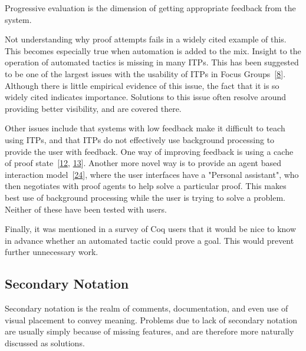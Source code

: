 \documentclass[
]{article}
\begin{document}
Progressive evaluation is the dimension of getting appropriate feedback
from the system.

Not understanding why proof attempts fails in a widely cited example of
this. This becomes especially true when automation is added to the mix.
Insight to the operation of automated tactics is missing in many ITPs.
This has been suggested to be one of the largest issues with the
usability of ITPs in Focus
Groups~{[}\protect\hyperlink{ref-beckert_usability_2015}{8}{]}. Although
there is little empirical evidence of this issue, the fact that it is so
widely cited indicates importance. Solutions to this issue often resolve
around providing better visibility, and are covered there.

Other issues include that systems with low feedback make it difficult to
teach using ITPs, and that ITPs do not effectively use background
processing to provide the user with feedback. One way of improving
feedback is using a cache of proof
state~{[}\protect\hyperlink{ref-berman_development_2014}{12},
\protect\hyperlink{ref-bourke_challenges_2012}{13}{]}. Another more
novel way is to provide an agent based interaction
model~{[}\protect\hyperlink{ref-hunter_agent-based_2005}{24}{]}, where
the user interfaces have a "Personal assistant", who then negotiates
with proof agents to help solve a particular proof. This makes best use
of background processing while the user is trying to solve a problem.
Neither of these have been tested with users.

Finally, it was mentioned in a survey of Coq users that it would be nice
to know in advance whether an automated tactic could prove a goal. This
would prevent further unnecessary work.

\hypertarget{secondary-notation-1}{%
\subsection{Secondary Notation}\label{secondary-notation-1}}

Secondary notation is the realm of comments, documentation, and even use
of visual placement to convey meaning. Problems due to lack of secondary
notation are usually simply because of missing features, and are
therefore more naturally discussed as solutions.
\end{document}
